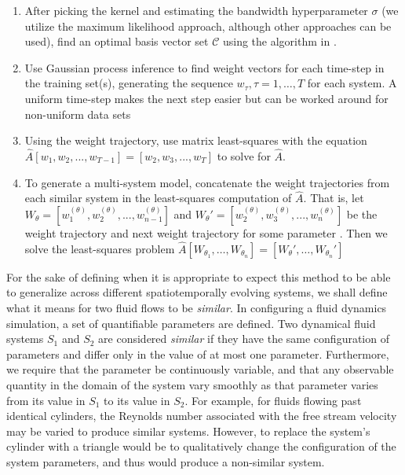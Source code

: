 \documentclass[letterpaper,12pt,peerreviewca,draftcls]{IEEEtran}
\newcommand{\s}{\sigma}
\newcommand{\weight}{w}
\newcommand{\shCent}{\mathcal{C}}
\newcommand{\dualop}{A}
\newcommand{\dualopApprox}{\widehat{\dualop}}
\newcommand{\tindex}{\tau}
\begin{document}
\begin{enumerate}
	\item After picking the kernel and estimating the bandwidth hyperparameter $\s$ (we utilize the maximum likelihood approach, although other approaches can be used), find an optimal basis vector set $\shCent$ using the algorithm in \cite{csato2002sparse}.
	\item Use Gaussian process inference to find weight vectors for each time-step in the training set(s), generating the sequence $\weight_\tindex, \tindex=1,\dots,T$ for each system. A uniform time-step makes the next step easier but can be worked around for non-uniform data sets
	\item Using the weight trajectory, use matrix least-squares with the equation $\dualopApprox [\weight_1,\weight_2, ...,\weight_{T-1}] = [\weight_2,\weight_3,...,\weight_T]$ to solve for $\dualopApprox$.
	\item To generate a multi-system model, concatenate the weight trajectories from each similar system in the least-squares computation of $\dualopApprox$. That is, let $W_{\theta} = [\weight_1^{(\theta)},\weight_2^{(\theta)}, ...,\weight_{n-1}^{(\theta)}]$ and $W_{\theta}' = [\weight_2^{(\theta)},\weight_3^{(\theta)}, ...,\weight_n^{(\theta)}]$ be the weight trajectory and next weight trajectory for some parameter . Then we solve the least-squares problem $\dualopApprox [W_{\theta_1},\dots,W_{\theta_n}] = [W_{\theta}',\dots,W_{\theta_n}']$
\end{enumerate}

For the sake of defining when it is appropriate to expect this method to be able to generalize across different spatiotemporally evolving systems, we shall define what it means for two fluid flows to be \emph{similar}. In configuring a fluid dynamics simulation, a set of quantifiable parameters are defined. Two dynamical fluid systems $S_1$ and $S_2$ are considered \emph{similar} if they have  the same configuration of parameters and differ only in the value of at most one parameter. Furthermore, we require that the parameter be continuously variable, and that any observable quantity in the domain of the system vary smoothly as that parameter varies from its value in $S_1$ to its value in $S_2$. For example, for fluids flowing past identical cylinders, the Reynolds number associated with the free stream velocity may be varied to produce similar systems. However, to replace the system's cylinder with a triangle would be to qualitatively change the configuration of the system parameters, and thus would produce a non-similar system.
\end{document}
